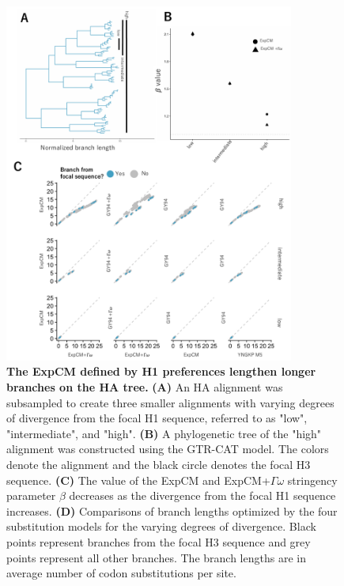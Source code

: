 \documentclass[11pt]{article}
\begin{document}
\begin{figure}[H]
\centerline{\includegraphics[width=0.85\textwidth]{figures/experiment_doud}}
\caption{\label{fig:experiment_doud}
\textbf{The ExpCM defined by H1 preferences lengthen longer branches on the HA tree.} 
\textbf{(A)} An HA alignment was subsampled to create three smaller alignments with varying degrees of divergence from the focal H1 sequence, referred to as "low", "intermediate", and "high". 
\textbf{(B)} A phylogenetic tree of the "high" alignment was constructed using the GTR-CAT model. 
The colors denote the alignment and the black circle denotes the focal H3 sequence. 
\textbf{(C)} The value of the ExpCM and ExpCM+$\Gamma\omega$ stringency parameter $\beta$ decreases as the divergence from the focal H1 sequence increases. 
\textbf{(D)} Comparisons of branch lengths optimized by the four substitution models for the varying degrees of divergence. 
Black points represent branches from the focal H3 sequence and grey points represent all other branches.  
The branch lengths are in average number of codon substitutions per site. 
}
\end{figure}

\clearpage 


\end{document}
